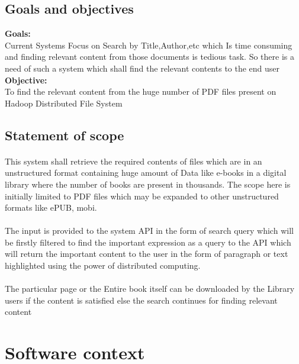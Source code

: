 \documentclass[oneside,a4paper,12pt]{report}
\begin{document}
\subsection{Goals and objectives}
\noindent \textbf{Goals:} \\
Current Systems Focus on Search by Title,Author,etc which Is time consuming and finding relevant content from those documents is tedious task. So there is a need of such a system which shall find the relevant contents to the end user \\

\noindent \textbf{Objective:} \\
To find the relevant content from the huge number of PDF files present on Hadoop Distributed File System \\

\subsection{Statement of scope}
\paragraph{}
This system shall retrieve the required contents of files which are in an unstructured format containing huge amount of Data like e-books in a digital library where the number of books are present in thousands. The scope here is initially limited to PDF files which may be expanded to other unstructured formats like ePUB, mobi.  

\paragraph{}
The input is provided to the system API in the form of search query which will be firstly filtered to find the important expression as a query to the API which will return the important content to the user in the form of paragraph or text highlighted using the power of distributed computing. 

\paragraph{}
The particular page or the Entire book itself can be downloaded by the Library users if the content is satisfied else the search continues for finding relevant content 


\section{Software context}
\end{document}
